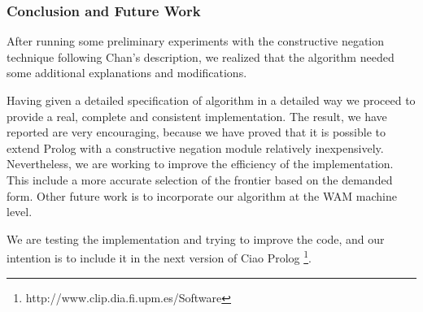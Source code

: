 \documentclass{llncs}
\begin{document}
% 


\vspace{-1em}
\subsubsection{Conclusion and Future Work}
\label{conclusion}
\vspace{-1em}
After running some preliminary experiments with the constructive 
negation technique  following Chan's description, we realized that the
algorithm needed some additional explanations and modifications.

Having given a detailed specification of algorithm in a detailed way
we proceed to provide a real, complete and consistent
implementation. The result, we have reported are very encouraging,
because we have proved that it is possible to extend Prolog with a
constructive negation module relatively inexpensively. 
Nevertheless, we are
working to improve the efficiency of the implementation. This include
a more accurate selection of the frontier based on the demanded form.
Other future work is to
incorporate our algorithm at the WAM machine level.

We are testing the implementation and trying to improve the code, and
our intention is to include it in the next version of Ciao Prolog
\footnote{http://www.clip.dia.fi.upm.es/Software}.
  


 \begin{small}

     
    

 \end{small}


\end{document}
